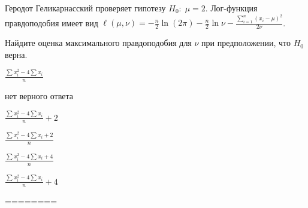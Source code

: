 
\begin{question}
Геродот Геликарнасский проверяет гипотезу \(H_0: \; \mu=2\). Лог-функция
правдоподобия имеет вид
\(\ell(\mu,\nu)=-\frac{n}{2}\ln (2\pi)-\frac{n}{2}\ln \nu -\frac{\sum_{i=1}^n(x_i-\mu)^2}{2\nu}\).

Найдите оценка максимального правдоподобия для \(\nu\) при
предположении, что \(H_0\) верна.
\begin{answerlist}
  \item \(\frac{\sum x_i^2 - 4\sum x_i}{n}\)
  \item нет верного ответа
  \item \(\frac{\sum x_i^2 - 4\sum x_i}{n}+2\)
  \item \(\frac{\sum x_i^2 - 4\sum x_i+2}{n}\)
  \item \(\frac{\sum x_i^2 - 4\sum x_i+4}{n}\)
  \item \(\frac{\sum x_i^2 - 4\sum x_i}{n}+4\)
\end{answerlist}
\end{question}

\begin{solution}
========
\end{solution}

